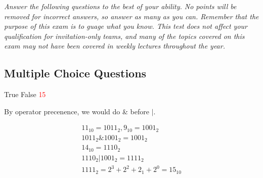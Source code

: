 \documentclass[11pt,addpoints]{exam}
\begin{document}
\noindent
\textit{Answer the following questions to the best of your ability. No points will be removed for incorrect answers, so answer as many as you can. Remember that the purpose of this exam is to guage what you know. This test does not affect your qualification for invitation-only teams, and many of the topics covered on this exam may not have been covered in weekly lectures throughout the year.}

\begin{questions} %

\section{Multiple Choice Questions}


\begin{minipage}{\textwidth}

\begin{choices}
  \choice True
  \choice False
  \choice \textcolor{red}{15}
   \\
\end{choices}
\end{minipage}

By operator precenence, we would do \& before $|$.

\begin{align*}
  11_{10} = 1011_{2}, 9_{10} = 1001_{2} \\
  1011_{2} \& 1001_{2} = 1001_{2} \\
  14_{10} = 1110_{2} \\
  1110_{2} | 1001_{2} = 1111_{2} \\
  1111_{2} = 2^{3} + 2^{2} + 2_{1} + 2^{0} = 15_{10} \\
\end{align*}

\begin{minipage}{\textwidth}


\end{minipage}
\end{questions}
\end{document}
